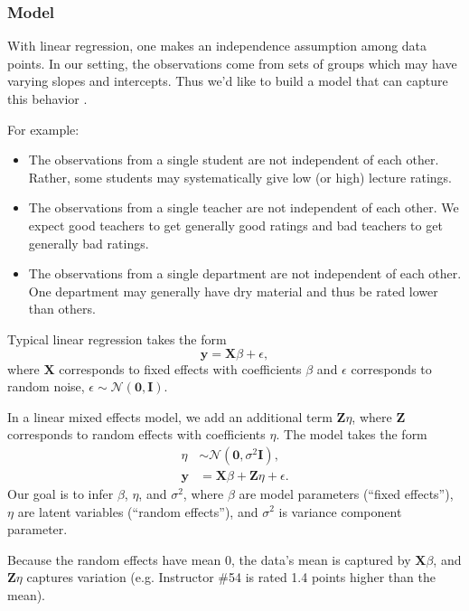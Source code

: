\subsubsection{Model}

With linear regression, one makes an independence assumption among data
points. In our setting, the observations come from sets of
groups which may have varying slopes and intercepts. Thus we'd like to
build a model that can capture this behavior \citep{gelman2006data}.

For example:
\begin{itemize}
\item The observations from a single student are not independent of
each other. Rather, some students may systematically give low (or
high) lecture ratings.
\item The observations from a single teacher are not independent of
each other. We expect good teachers to get generally good ratings and
bad teachers to get generally bad ratings.
\item The observations from a single department are not independent of
each other. One department may generally have dry material and thus be
rated lower than others.
\end{itemize}

Typical linear regression takes the form
\begin{equation*}
\mathbf{y} = \mathbf{X}\beta + \epsilon,
\end{equation*}
where $\mathbf{X}$ corresponds to fixed effects with coefficients
$\beta$ and $\epsilon$ corresponds to random noise,
$\epsilon\sim\mathcal{N}(\mathbf{0}, \mathbf{I})$.

In a linear mixed effects model, we add an additional term
$\mathbf{Z}\eta$, where $\mathbf{Z}$ corresponds to random effects
with coefficients $\eta$. The model takes the form
\begin{align*}
\eta &\sim \mathcal{N}(\mathbf{0}, \sigma^2 \mathbf{I}), \\
\mathbf{y} &= \mathbf{X}\beta + \mathbf{Z}\eta + \epsilon.
\end{align*}
Our goal is to infer $\beta$, $\eta$, and $\sigma^2$, where $\beta$
are model parameters (``fixed effects''), $\eta$ are latent
variables (``random effects''), and $\sigma^2$ is variance component
parameter.

Because the random effects have mean 0, the data's mean is captured by
$\mathbf{X}\beta$, and $\mathbf{Z}\eta$ captures variation (e.g.
Instructor \#54 is rated 1.4 points higher than the mean).

